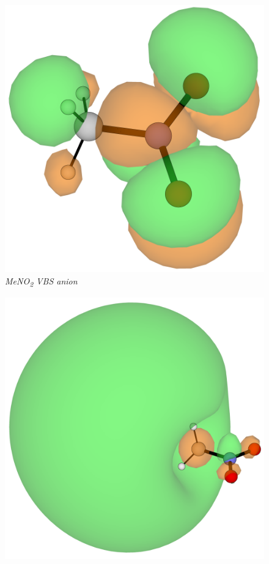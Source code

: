\begin{figure}[h]
  \centering
  \begin{minipage}[b]{0.27\textwidth}
    \centering
    \includegraphics[width=\textwidth]{chapters/introduction/image/MeNO2_VBS.png}
    \small\emph{MeNO\textsubscript{2} VBS anion}
  \end{minipage}
  \hfill
  \begin{minipage}[b]{0.30\textwidth}
    \centering
    \includegraphics[width=\textwidth]{chapters/introduction/image/MeNO2_DBS.png}

\end{minipage}
\end{figure}
